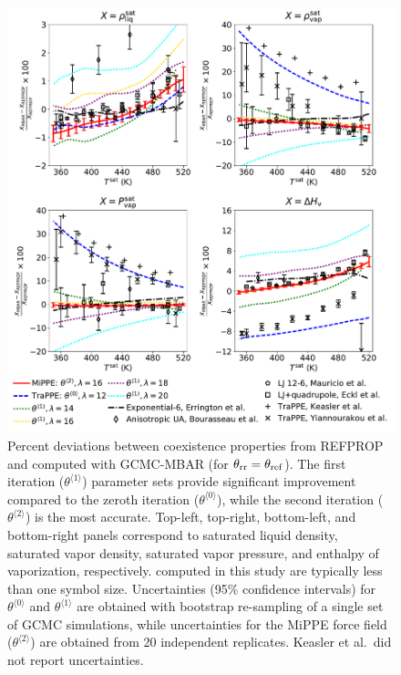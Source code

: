 \documentclass[journal=jced,manuscript=article]{achemso}
\begin{document}
\begin{figure}[H]
	\centering
		\includegraphics[width=5.8in]{CYC6_deviations_iterations.pdf}
	\caption{Percent deviations between coexistence properties from REFPROP and computed with GCMC-MBAR (for $\theta_{\rm rr} = \theta_{\rm ref}$). The first iteration ($\theta^{\langle1\rangle}$) parameter sets provide significant improvement compared to the zeroth iteration ($\theta^{\langle0\rangle}$), while the second iteration ($\theta^{\langle2\rangle}$) is the most accurate. Top-left, top-right, bottom-left, and bottom-right panels correspond to saturated liquid density, saturated vapor density, saturated vapor pressure, and enthalpy of vaporization, respectively.  computed in this study are typically less than one symbol size. Uncertainties (95\% confidence intervals) for $\theta^{\langle0\rangle}$ and $\theta^{\langle1\rangle}$ are obtained with bootstrap re-sampling of a single set of GCMC simulations, while uncertainties for the MiPPE force field ($\theta^{\langle2\rangle}$) are obtained from 20 independent replicates. Keasler et al.~did not report uncertainties.}
	\label{fig: VLE cyclohexane}
\end{figure}

\end{document}
